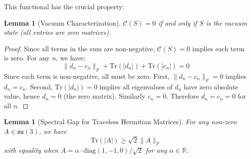 \documentclass[11pt]{article}
\numberwithin{equation}{section}
\newtheorem{lemma}[theorem]{Lemma}
\theoremstyle{definition}
\theoremstyle{remark}
\begin{document}
This functional has the crucial property:

\begin{lemma}[Vacuum Characterization]
\label{lem:vacuum}
$\mathcal{C}(S) = 0$ if and only if $S$ is the vacuum state (all entries are zero matrices).
\end{lemma}

\begin{proof}
Since all terms in the sum are non-negative, $\mathcal{C}(S) = 0$ implies each term is zero. For any $n$, we have:
\[\|d_n - c_n\|_F + \text{Tr}(|d_n|) + \text{Tr}(|c_n|) = 0\]
Since each term is non-negative, all must be zero. First, $\|d_n - c_n\|_F = 0$ implies $d_n = c_n$. Second, $\text{Tr}(|d_n|) = 0$ implies all eigenvalues of $d_n$ have zero absolute value, hence $d_n = 0$ (the zero matrix). Similarly $c_n = 0$. Therefore $d_n = c_n = 0$ for all $n$.
\end{proof}

\begin{lemma}[Spectral Gap for Traceless Hermitian Matrices]
\label{lem:spectral-gap}
For any non-zero $A \in \mathfrak{su}(3)$, we have
\begin{equation}
\text{Tr}(|A|) \geq \sqrt{2} \|A\|_F
\end{equation}
with equality when $A = \alpha \cdot \text{diag}(1,-1,0)/\sqrt{2}$ for any $\alpha \in \mathbb{R}$.
\end{lemma}
\end{document}
